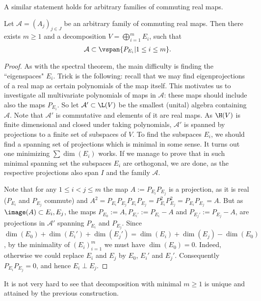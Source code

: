 A similar statement holds for arbitrary families of commuting real maps.

\begin{lause}\label{commuting_real_maps}
	Let $\mathcal{A} = (A_{j})_{j \in J}$ be an arbitrary family of commuting real maps. Then there exists $m \geq 1$ and a decomposition $V = \bigoplus_{i = 1}^{m} E_{i}$, such that
	\begin{align*}
		\mathcal{A} \subset \vspan \{P_{E_{i}} | 1 \leq i \leq m \}.
	\end{align*}
\end{lause}
\begin{proof}
	As with the spectral theorem, the main difficulty is finding the ``eigenspaces" $E_{i}$. Trick is the following: recall that we may find eigenprojections of a real map as certain polynomials of the map itself. This motivates us to investigate all multivariate polynomials of maps in $\mathcal{A}$: these maps should include also the maps $P_{E_{i}}$. So let $\mathcal{A}' \subset \L(V)$ be the smallest (unital) algebra containing $\mathcal{A}$. Note that $\mathcal{A}'$ is commutative and elements of it are real maps. As $\H(V)$ is finite dimensional and closed under taking polynomials, $\mathcal{A}'$ is spanned by projections to a finite set of subspaces of $V$. To find the subspaces $E_{i}$, we should find a spanning set of projections which is minimal in some sense. It turns out one minimizing $\sum \dim(E_{i})$ works. If we manage to prove that in such minimal spanning set the subspaces $E_{i}$ are orthogonal, we are done, as the respective projections also span $I$ and the family $\mathcal{A}$.

	Note that for any $1 \leq i < j \leq m$ the map $A := P_{E_{i}} P_{E_{j}}$ is a projection, as it is real ($P_{E_{i}}$ and $P_{E_{j}}$ commute) and $A^{2} = P_{E_{i}} P_{E_{j}} P_{E_{i}} P_{E_{j}} = P_{E_{i}}^2 P_{E_{j}}^2 = P_{E_{i}} P_{E_{j}} = A$. But as $\image(A) \subset E_{i}, E_{j}$, the maps $P_{E_{0}} := A, P_{E_{i}'} := P_{E_{i}} - A$ and $P_{E_{j}'} := P_{E_{j}} - A$, are projections in $\mathcal{A}'$ spanning $P_{E_{i}}$ and $P_{E_{j}}$. Since $\dim(E_{0}) + \dim(E_{i}') + \dim(E_{j}') = \dim(E_{i}) + \dim(E_{j}) - \dim(E_{0})$, by the minimality of $(E_{i})_{i = 1}^{m}$ we must have $\dim(E_{0}) = 0$. Indeed, otherwise we could replace $E_{i}$ and $E_{j}$ by $E_{0}$, $E_{i}'$ and $E_{j}'$. Consequently $P_{E_{i}} P_{E_{j}} = 0$, and hence $E_{i} \perp E_{j}$.
\end{proof}

It is not very hard to see that decomposition with minimal $m \geq 1$ is unique and attained by the previous construction.


